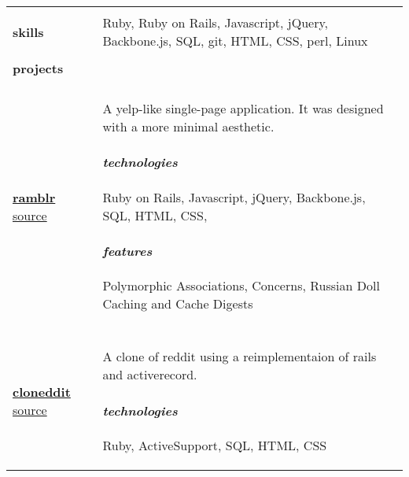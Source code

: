 \documentclass{article}
\begin{document}
\begin{tabular}{L{3cm} R{13.5cm}}
     \hline \\

    \Large{\textbf{skills}}
    \normalsize

    &

    Ruby, Ruby on Rails, Javascript, jQuery, Backbone.js, SQL, git, HTML,
    CSS, perl, Linux
    
    \\ \hline \\

    \Large{\textbf{projects}} \\\\
    \normalsize
    
    \href{http://www.ramblr.co}{\large{\textbf{ramblr}}}
    \normalsize
    \newline
    \href{https://github.com/kellyjospehprice/ramblr}{source}
    
    &
    
    A yelp-like single-page application. It was designed with a more
    minimal aesthetic.

    \paragraph{\textit{technologies}}{
        Ruby on Rails, Javascript, jQuery, Backbone.js, SQL, HTML, CSS,
    }

    \paragraph{\textit{features}}{
        Polymorphic Associations, Concerns, Russian Doll Caching and Cache 
        Digests
    }

    \\\\
    
    \href{http://klog.io/cloneddit}{\large{\textbf{cloneddit}}}
    \normalsize
    \newline
    \href{https://github.com/kellyjospehprice/cloneddit}{source}
    
    &
    
    A clone of reddit using a reimplementaion of rails and
    activerecord.

    \paragraph{\textit{technologies}}{
        Ruby, ActiveSupport, SQL, HTML, CSS
    }


\end{tabular}
\end{document}
